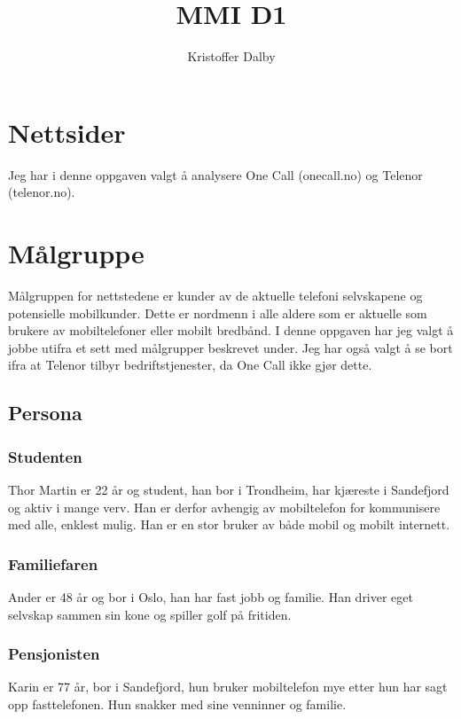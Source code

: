 \documentclass[a4paper, 10pt]{article}
\title{MMI D1}
\author{Kristoffer Dalby}
\date{}
\begin{document}
\maketitle

\thispagestyle{empty}
\newpage
{}
\setcounter{page}{1}

\section*{Nettsider}
Jeg har i denne oppgaven valgt å analysere One Call (onecall.no) og Telenor (telenor.no).

\section*{Målgruppe}
Målgruppen for nettstedene er kunder av de aktuelle telefoni selvskapene og potensielle mobilkunder. Dette er nordmenn i alle aldere som er aktuelle som brukere av mobiltelefoner eller mobilt bredbånd. I denne oppgaven har jeg valgt å jobbe utifra et sett med målgrupper beskrevet under. Jeg har også valgt å se bort ifra at Telenor tilbyr bedriftstjenester, da One Call ikke gjør dette.\\

\subsection*{Persona}
\subsubsection*{Studenten}
Thor Martin er 22 år og student, han bor i Trondheim, har kjæreste i Sandefjord og aktiv i mange verv. Han er derfor avhengig av mobiltelefon for kommunisere med alle, enklest mulig. Han er en stor bruker av både mobil og mobilt internett.\\

\subsubsection*{Familiefaren}
Ander er 48 år og bor i Oslo, han har fast jobb og familie. Han driver eget selvskap sammen sin kone og spiller golf på fritiden.

\subsubsection*{Pensjonisten}
Karin er 77 år, bor i Sandefjord, hun bruker mobiltelefon mye etter hun har sagt opp fasttelefonen. Hun snakker med sine venninner og familie. 
\end{document}
